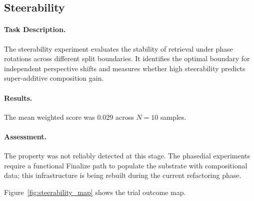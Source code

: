 \subsection{Steerability}
\label{sec:steerability}

\paragraph{Task Description.}
The steerability experiment evaluates the stability of retrieval under phase rotations across
different split boundaries.  It identifies the optimal boundary for
independent perspective shifts and measures whether high steerability
predicts super-additive composition gain.

\paragraph{Results.}
The mean weighted score was 0.029 across $N = 10$ samples.

\paragraph{Assessment.}
The property was not reliably detected at this stage.  The phasedial
experiments require a functional Finalize path to populate the substrate
with compositional data; this infrastructure is being rebuilt during
the current refactoring phase.

Figure~\ref{fig:steerability_map} shows the trial outcome map.
